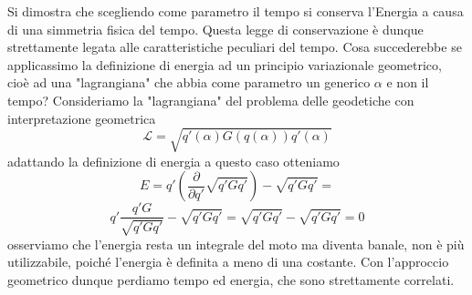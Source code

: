 \documentclass[
10pt, %
a4paper, %
oneside, %
headinclude,footinclude, %
BCOR5mm, %
]{scrartcl}
\begin{document}
\begin{osservazione}
	Si dimostra che scegliendo come parametro il tempo si conserva l'Energia a causa di una simmetria fisica del tempo. Questa legge di conservazione è dunque strettamente legata alle caratteristiche peculiari del tempo. Cosa succederebbe se applicassimo la definizione di energia ad un principio variazionale geometrico, cioè ad una "lagrangiana" che abbia come parametro un generico $\alpha$ e non il tempo? Consideriamo la "lagrangiana" del problema delle geodetiche con interpretazione geometrica
	\[\mathcal{L} = \sqrt{q'(\alpha)G(q(\alpha))q'(\alpha)}\]
	adattando la definizione di energia a questo caso otteniamo 
	\[E = q'\left(\frac{\partial }{\partial q'}\sqrt{q'Gq'}\right)-\sqrt{q'Gq'}=\]
	\[q'\frac{q'G}{\sqrt{q'Gq'}}-\sqrt{q'Gq'} = \sqrt{q'Gq'}-\sqrt{q'Gq'} = 0 \]
	osserviamo che l'energia resta un integrale del moto ma diventa banale, non è più utilizzabile, poiché l'energia è definita a meno di una costante. Con l'approccio geometrico dunque perdiamo tempo ed energia, che sono strettamente correlati. 
\end{osservazione}
\end{document}
